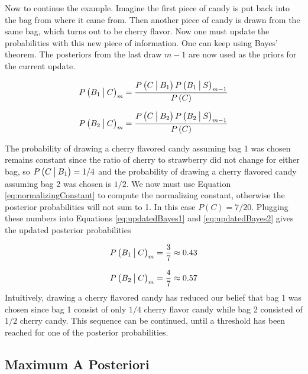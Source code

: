 Now to continue the example. Imagine the first piece of candy is put back into the bag from where it came from. Then another piece of candy is drawn from the same bag, which turns out to be cherry flavor. Now one must update the probabilities with this new piece of information. One can keep using Bayes' theorem. The posteriors from the last draw $m-1$ are now used as the priors for the current update.

\begin{equation}
	P \left( B_1 \given[\big] C \right)_{ m } = \frac{ P \left( C \given[\big] B_1 \right) P \left( B_1 \given[\big] S \right)_{m-1} }{ P \left( C \right)   }
\label{eq:updatedBayes1}
\end{equation}

\begin{equation}
	P \left( B_2 \given[\big] C \right)_{ m } = \frac{ P \left( C \given[\big] B_2 \right) P \left( B_2 \given[\big] S \right)_{m-1} }{ P \left( C \right)  }
\label{eq:updatedBayes2}
\end{equation}

The probability of drawing a cherry flavored candy assuming bag 1 was chosen remains constant since the ratio of cherry to strawberry did not change for either bag, so  $P \left( C \given[\big] B_1 \right) = 1/4$ and the probability of drawing a cherry flavored candy assuming bag 2 was chosen is $1/2$. We now must use Equation \ref{eq:normalizingConstant} to compute the normalizing constant, otherwise the posterior probabilities will not sum to 1. In this case $ P(C) = 7/20 $. Plugging these numbers into Equations \ref{eq:updatedBayes1} and \ref{eq:updatedBayes2} gives the updated posterior probabilities

\begin{equation}
	P \left( B_1 \given[\big] C \right)_{ m } = \frac{3}{7} \approx 0.43
\end{equation}

\begin{equation}
	P \left( B_2 \given[\big] C \right)_{ m } = \frac{4}{7} \approx 0.57
\end{equation}
%
Intuitively, drawing a cherry flavored candy has reduced our belief that bag 1 was chosen since bag 1 consist of only $1/4$ cherry flavor candy while bag 2 consisted of $1/2$ cherry candy. This sequence can be continued, until a threshold has been reached for one of the posterior probabilities.

\subsection{Maximum A Posteriori}

